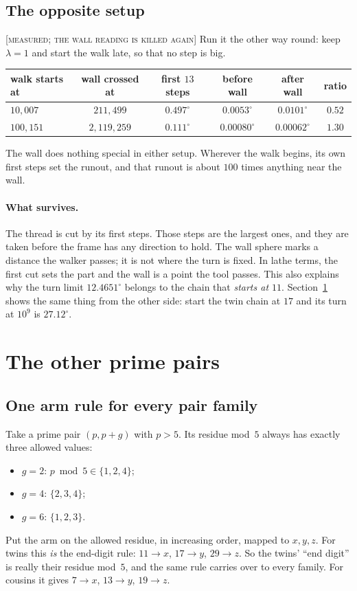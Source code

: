 \documentclass[11pt]{article}
\theoremstyle{definition}
\theoremstyle{remark}
\newcommand{\grade}[1]{\textsc{[#1]}}
\begin{document}
\subsection{The opposite setup} \grade{measured; the wall reading is killed again}
Run it the other way round: keep $\lambda=1$ and start the walk late, so that no step is big.

\begin{center}\begin{tabular}{lccccc}
\toprule
walk starts at & wall crossed at & first $13$ steps & before wall & after wall & ratio\\
\midrule
$10{,}007$ & $211{,}499$ & $0.497^\circ$ & $0.0053^\circ$ & $0.0101^\circ$ & $0.52$\\
$100{,}151$ & $2{,}119{,}259$ & $0.111^\circ$ & $0.00080^\circ$ & $0.00062^\circ$ & $1.30$\\
\bottomrule
\end{tabular}\end{center}

The wall does nothing special in either setup. Wherever the walk begins, its own first steps set the runout, and that runout is about $100$ times anything near the wall.

\paragraph{What survives.} The thread is cut by its first steps. Those steps are the largest ones, and they are taken before the frame has any direction to hold. The wall sphere marks a distance the walker passes; it is not where the turn is fixed. In lathe terms, the first cut sets the part and the wall is a point the tool passes. This also explains why the turn limit $12.4651^\circ$ belongs to the chain that \emph{starts at $11$}. Section~\ref{sec:families} shows the same thing from the other side: start the twin chain at $17$ and its turn at $10^9$ is $27.12^\circ$.

\section{The other prime pairs}\label{sec:families}

\subsection{One arm rule for every pair family}
Take a prime pair $(p,p+g)$ with $p>5$. Its residue mod~$5$ always has exactly three allowed values:
\begin{itemize}
\item $g=2$: $p\bmod5\in\{1,2,4\}$;
\item $g=4$: $\{2,3,4\}$;
\item $g=6$: $\{1,2,3\}$.
\end{itemize}
Put the arm on the allowed residue, in increasing order, mapped to $x,y,z$. For twins this \emph{is} the end-digit rule: $11\to x$, $17\to y$, $29\to z$. So the twins' ``end digit'' is really their residue mod~$5$, and the same rule carries over to every family. For cousins it gives $7\to x$, $13\to y$, $19\to z$.
\end{document}
